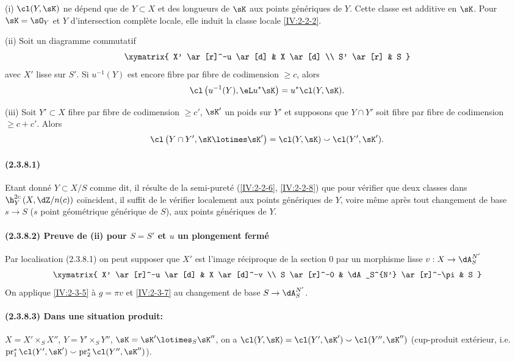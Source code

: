 \begin{theorem}\label{IV:2-3-8}
(i) $\cl(Y,\sK)$ ne dépend que de $Y\subset X$ et des longueurs de $\sK$ aux 
points génériques de $Y$. Cette classe est additive en $\sK$. Pour 
$\sK=\sO_Y$ et $Y$ d'intersection complète locale, elle induit la classe 
locale \ref{IV:2-2-2}.

(ii) Soit un diagramme commutatif 
\[\xymatrix{
  X' \ar[r]^-u \ar[d] 
    & X \ar[d] \\
  S' \ar[r] 
    & S
}\]
avec $X'$ lisse sur $S'$. Si $u^{-1}(Y)$ est encore fibre par fibre de 
codimension $\geqslant c$, alors 
\[
  \cl\left(u^{-1}(Y),\eL u^\ast\sK\right) = u^\ast \cl(Y,\sK) \text{.}
\]

(iii) Soit $Y'\subset X$ fibre par fibre de codimension $\geqslant c'$, 
$\sK'$ un poids sur $Y'$ et supposons que $Y\cap Y'$ soit fibre par fibre de 
codimension $\geqslant c+c'$. Alors 
\[
\cl\left(Y\cap Y',\sK\lotimes \sK'\right) = \cl(Y,\sK) \smallsmile \cl(Y',\sK') \text{.}
\]
\end{theorem}



\paragraph{(2.3.8.1)}\label{IV:2-3-8-1}
Etant donné $Y\subset X/S$ comme dit, il résulte de la semi-pureté 
(\ref{IV:2-2-6}, \ref{IV:2-2-8}) que pour vérifier que deux classes dans 
$\h_Y^{2 c}\left(X,\dZ/n(c)\right)$ coïncident, il suffit de le vérifier 
localement aux points génériques de $Y$, voire même après tout 
changement de base $s\to S$ ($s$ point géométrique générique de $S$), 
aux points génériques de $Y$. 

\paragraph{(2.3.8.2) Preuve de (ii) pour $S=S'$ et $u$ un plongement fermé}
Par localisation (2.3.8.1) on peut supposer que $X'$ est l'image 
réciproque de la section $0$ par un morphisme lisse $v:X\to \dA_S^{N'}$ 
\[\xymatrix{
  X' \ar[r]^-u \ar[d] 
    & X \ar[d]^-v \\
  S \ar[r]^-0 
    & \dA_S^{N'} \ar[r]^-\pi 
    & S
}\]
On applique \ref{IV:2-3-5} à $g=\pi v$ et \ref{IV:2-3-7} au changement de 
base $S\to \dA_S^{N'}$. 

\paragraph{(2.3.8.3) Dans une situation produit:}
$X=X'\times_S X''$, $Y=Y'\times_S Y''$, $\sK=\sK'\lotimes_S \sK''$, on a 
$\cl(Y,\sK) = \cl(Y',\sK')\smallsmile \cl(Y'',\sK'')$ (cup-produit extérieur, 
i.e. $\operatorname{pr}_1^\ast \cl(Y',\sK')\smallsmile \operatorname{pr}_2^\ast \cl(Y'',\sK'')$). 

